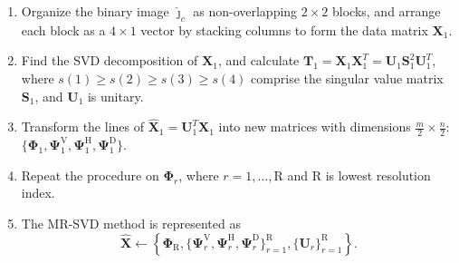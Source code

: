 \documentclass[journal]{IEEEtran}
\begin{document}
\begin{enumerate}
\item Organize the binary image $\bm{\widehat\jmath}_c$ as non-overlapping $2\times 2$ blocks, and arrange each block as a $4\times 1$ vector by stacking columns to form the data matrix $\bm X_1$.
\item Find the SVD decomposition of $\bm X_1$, and calculate $\bm T_1=\bm X_1 \bm X_1^T=\bm U_1 \bm S_1^2 \bm U_1^T$, where $s(1)\geq s(2) \geq s(3) \geq s(4)$ comprise the singular value matrix $\bm S_1$, 
 and $\bm U_1$ is unitary.
\item 
Transform the lines of $\widehat{\bm X}_1=\bm U_1^T\bm X_1$ into new matrices with dimensions $\frac{m}{2}\times\frac{n}{2}$: $\{\bm\Phi_1, \bm\Psi_1^\text{V}, \bm\Psi_1^\text{H}, \bm\Psi_1^\text{D}\}$. 
\item Repeat the procedure on $\bm\Phi_r$, where $r=1,\dots,\text{R}$ and $\text{R}$ is lowest resolution index. 
\item The MR-SVD method is represented as
\begin{equation}\label{msvd_iter}
\widehat{\bm X}\leftarrow \left\{\bm \Phi_\text{R},\{\bm\Psi_r^\text{V},\bm\Psi_r^\text{H},\bm\Psi_r^\text{D} \}_{r=1}^\text{R},\{\bm U_r\}_{r=1}^\text{R} \right\}.
\end{equation}

\end{enumerate}
\end{document}
